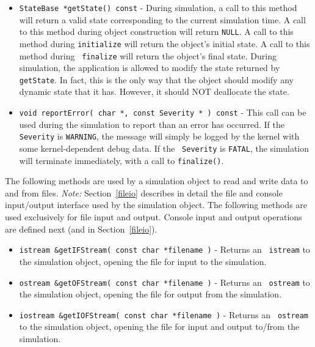 \documentclass[11pt]{article}
\begin{document}
\begin{itemize}
\item{\tt StateBase *getState() const} - During simulation, a call to
  this method will return a valid state corresponding to the current
  simulation time.  A call to this method during object construction will
  return {\tt NULL}.  A call to this method during {\tt initialize} will
  return the object's initial state.  A call to this method during {\tt
  finalize} will return the object's final state.  During simulation, the
  application is allowed to modify the state returned by {\tt getState}.
  In fact, this is the only way that the object should modify any dynamic
  state that it has.  However, it should NOT deallocate the state.

\item{\tt void reportError( char *, const Severity * ) const} - This call
  can be used during the simulation to report than an error has occurred.
  If the {\tt Severity} is {\tt WARNING}, the message will simply be
  logged by the kernel with some kernel-dependent debug data.  If the {\tt
  Severity} is {\tt FATAL}, the simulation will terminate immediately,
  with a call to {\tt finalize()}.

\end{itemize}

The following methods are used by a simulation object to read and write
data to and from files.  \emph{Note:} Section~\ref{fileio} describes in
detail the file and console input/output interface used by the simulation
object. The following methods are used exclusively for file input and
output. Console input and output operations are defined next (and in
Section~\ref{fileio}).

\begin{itemize}

\item {\tt istream \&getIFStream( const char *filename )} - Returns an {\tt 
  istream} to the simulation object, opening the file for input to the
  simulation.

\item {\tt ostream \&getOFStream( const char *filename )} - Returns an {\tt 
  ostream} to the simulation object, opening the file for output from the
  simulation.

\item {\tt iostream \&getIOFStream( const char *filename )} - Returns an {\tt 
  ostream} to the simulation object, opening the file for input and output
  to/from the simulation.

\end{itemize}
\end{document}
